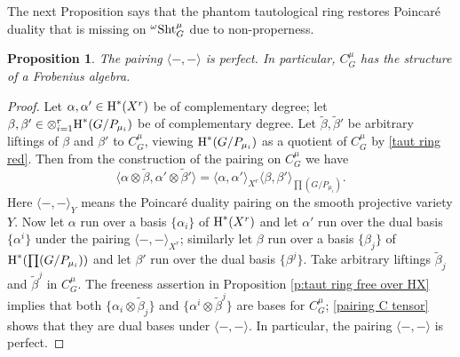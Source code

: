 \documentclass[reqno]{amsart}
\numberwithin{equation}{subsection}
\newtheorem{prop}[subsubsection]{Proposition}
\theoremstyle{definition}
\newcommand\Sht{\textup{Sht}}
\renewcommand{\j}[1]{\langle{#1}\rangle}
\newcommand{\wt}[1]{\widetilde{#1}}
\newcommand\ot{\otimes}
\newcommand{\cohog}[2]{\textup{H}^{#1}({#2})}     %
\renewcommand\a\alpha
\renewcommand\b\beta
\newcommand{\om}{\omega}
\begin{document}
The next Proposition says that the phantom tautological ring restores Poincar\'e duality that is missing on ${}^\om\Sht^\mu_G$ due to non-properness.

\begin{prop}\label{p:taut duality}
    The pairing $\j{-,-}$ is perfect. In particular, $C^\mu_G$ has the structure of a Frobenius algebra.
\end{prop}
\begin{proof} Let $\a, \a'\in \cohog{*}{X^r}$ be of complementary degree; let $\b,\b'\in \ot_{i=1}^r \cohog{*}{G/P_{\mu_i}}$ be of complementary degree. Let $\wt \b, \wt \b'$ be arbitrary liftings of $\b$ and $\b'$ to $C^\mu_G$, viewing $\cohog{*}{G/P_{\mu_i}}$ as a quotient of $C^\mu_G$ by \eqref{taut ring red}. Then from the construction of the pairing on $C^\mu_G$ we have
\begin{equation}\label{pairing C tensor}
\j{\a\ot\wt\b, \a'\ot \wt\b'}=\j{\a,\a'}_{X^r}\j{\b,\b'}_{\prod (G/P_{\mu_i})}.
\end{equation}
Here $\j{-,-}_{Y}$ means the Poincar\'e duality pairing on the smooth projective variety $Y$. Now let $\a$ run over a basis $\{\a_i\}$ of $\cohog{*}{X^r}$ and let $\a'$ run over the dual basis $\{\a^i\}$ under the pairing $\j{-,-}_{X^r}$; similarly let $\b$ run over a basis $\{\b_j\}$ of $\cohog{*}{\prod(G/P_{\mu_i})}$ and let $\b'$ run over the dual basis $\{\b^j\}$.  Take arbitrary liftings $\wt\b_j$ and $\wt\b^j$ in $C^\mu_G$. The freeness assertion in Proposition \ref{p:taut ring free over HX} implies that both  $\{\a_i\ot\wt\b_j\}$ and $\{\a^i\ot\wt\b^j\}$ are bases for $C^\mu_G$; \eqref{pairing C tensor} shows that they are dual bases under $\j{-,-}$. In particular, the pairing $\j{-,-}$ is perfect.
\end{proof}
\end{document}
